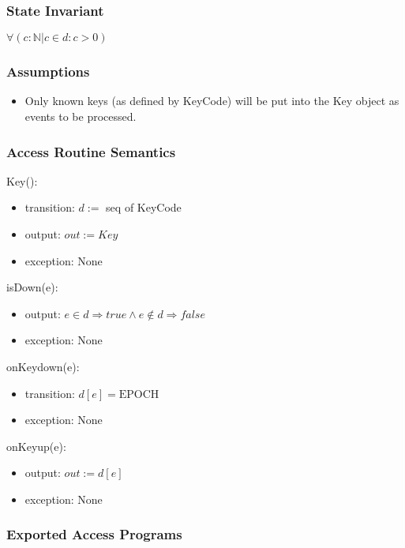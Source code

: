 \documentclass[12pt]{article}
\begin{document}
\subsubsection*{State Invariant}

$\forall (c : \mathbb{N} | c \in d : c > 0)$

\subsubsection*{Assumptions}

\begin{itemize}
    \item Only known keys (as defined by KeyCode) will be put into the Key object as events to be processed.
\end{itemize}

\subsubsection*{Access Routine Semantics}

Key():
\begin{itemize}
    \item transition: $d :=$ seq of KeyCode
    \item output: $out := Key$
    \item exception: None
\end{itemize}

\noindent isDown(e):
\begin{itemize}
    \item output: $e \in d \Rightarrow true \land e \notin d \Rightarrow false$
    \item exception: None
\end{itemize}

\noindent onKeydown(e):
\begin{itemize}
    \item transition: $d[e] = \mbox{EPOCH}$
    \item exception: None
\end{itemize}

\noindent onKeyup(e):
\begin{itemize}
    \item output: $out := d[e]$
    \item exception: None
\end{itemize}


\newpage %

\subsubsection*{Exported Access Programs}
\end{document}
